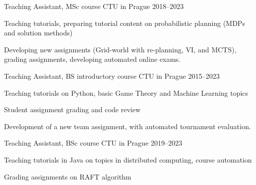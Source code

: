 \begin{cventries}


  \cventry
    {Teaching Assistant, MSc course} %
    {} %
    {CTU in Prague} %
    {2018--2023} %
    {
      \begin{cvitems} %
        \item {Teaching tutorials, preparing tutorial content on probabilistic planning (MDPs and solution methods)}
        \item {Developing new assignments (Grid-world with re-planning, VI, and MCTS), grading assignments, developing automated online exams.}
      \end{cvitems}
    }

  \cventry
    {Teaching Assistant, BS introductory course} %
    {} %
    {CTU in Prague} %
    {2015--2023} %
    {
      \begin{cvitems} %
        \item {Teaching tutorials on Python, basic Game Theory and Machine Learning topics}
        \item {Student assignment grading and code review}
        \item {Development of a new team assignment,  with automated tournament evaluation.}
      \end{cvitems}
    }

  \cventry
    {Teaching Assistant, BSc course} %
    {} %
    {CTU in Prague} %
    {2019--2023} %
    {
      \begin{cvitems} %
        \item {Teaching tutorials in Java on topics in distributed computing, course automation}
        \item {Grading assignments on RAFT algorithm}
      \end{cvitems}
    }

\end{cventries}
    


